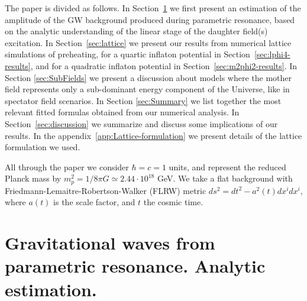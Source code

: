 \documentclass[a4paper,11pt]{article}
\begin{document}
The paper is divided as follows. In Section~\ref{sec:Analytics} we first present an estimation of the amplitude of the GW background produced during parametric resonance, based on the analytic understanding of the linear stage of the daughter field(s) excitation. In Section~\ref{sec:lattice} we present our results from numerical lattice simulations of preheating, for a quartic inflaton potential in Section~\ref{sec:lphi4-results}, and for a quadratic inflaton potential in Section~\ref{sec:m2phi2-results}. In Section \ref{sec:SubFields} we present a discussion about models where the mother field represents only a sub-dominant energy component of the Universe, like in spectator field scenarios. In Section \ref{sec:Summary} we list together the most relevant fitted formulas obtained from our numerical analysis. In Section~\ref{sec:discussion} we summarize and discuss some implications of our results. In the appendix~\ref{app:Lattice-formulation} we present details of the lattice formulation we used. 

All through the paper we consider $\hbar = c = 1$ units, and represent the reduced Planck mass by {\small$m_p^2 = {1/{8\pi G}} \simeq 2.44\cdot10^{18}$ GeV}. We take a flat background with Friedmann-Lemaitre-Robertson-Walker (FLRW) metric {\small$ds^2 =  dt^2 - a^2 (t) dx^i dx^i$}, where {\small$a(t)$} is the scale factor, and {\small$t$} the cosmic time. 

\section{Gravitational waves from parametric resonance. Analytic estimation.}
\label{sec:Analytics}
\end{document}
